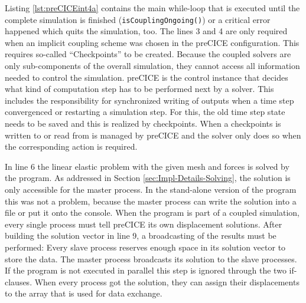    Listing \ref{lst:preCICEint4a} contains the main while-loop that is executed until the complete simulation is finished (\texttt{isCouplingOngoing()}) or a critical error happened which quits the simulation, too. The lines 3 and 4 are only required when an implicit coupling scheme was chosen in the preCICE configuration. This requires so-called ``Checkpoints'' to be created. Because the coupled solvers are only sub-components of the overall simulation, they cannot access all information needed to control the simulation. preCICE is the control instance that decides what kind of computation step has to be performed next by a solver. This includes the responsibility for synchronized writing of outputs when a time step convergenced or restarting a simulation step. For this, the old time step state needs to be saved and this is realized by checkpoints. When a checkpoints is written to or read from is managed by preCICE and the solver only does so when the corresponding action is required.
   
   In line 6 the linear elastic problem with the given mesh and forces is solved by the program. As addressed in Section \ref{sec:Impl-Details-Solving}, the solution is only accessible for the master process. In the stand-alone version of the program this was not a problem, because the master process can write the solution into a file or put it onto the console. When the program is part of a coupled simulation, every single process must tell preCICE its own displacement solutions. After building the solution vector in line 9, a broadcasting of the results must be performed: Every slave process reserves enough space in its solution vector to store the data. The master process broadcasts its solution to the slave processes. If the program is not executed in parallel this step is ignored through the two if-clauses. When every process got the solution, they can assign their displacements to the array that is used for data exchange.
   
